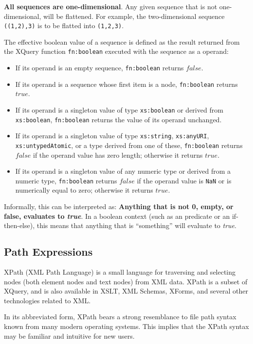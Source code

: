 \textbf{All sequences are one-dimensional}. Any given sequence that is not
one-dimensional, will be flattened. For example, the two-dimensional sequence
\verb!((1,2),3)! is to be flatted into \verb!(1,2,3)!.

The effective boolean value of a sequence is defined as the result returned from the XQuery function
\texttt{fn:boolean} executed with the sequence as a operand:
\begin{itemize}
  \item If its operand is an empty sequence, \texttt{fn:boolean} returns $false$.
  \item If its operand is a sequence whose first item is a node, \texttt{fn:boolean} returns $true$.
  \item If its operand is a singleton value of type \texttt{xs:boolean} or derived from \texttt{xs:boolean},
  \texttt{fn:boolean} returns the value of its operand unchanged.
  \item If its operand is a singleton value of type \texttt{xs:string}, \texttt{xs:anyURI},
  \texttt{xs:untypedAtomic}, or a type derived from one of these, \texttt{fn:boolean} returns $false$ if the
  operand value has zero length; otherwise it returns $true$.
  \item If its operand is a singleton value of any numeric type or derived from a numeric type,
  \texttt{fn:boolean} returns $false$ if the operand value is \texttt{NaN} or is numerically equal to zero;
  otherwise it returns $true$.
\end{itemize}
Informally, this can be interpreted as: \textbf{Anything that is not 0, empty, or false, evaluates to
\textit{true}}. In a boolean context (such as an predicate or an if-then-else), this means that
anything that is ``something'' will evaluate to \textit{true}.


\subsection{Path Expressions}
\label{sect:theory:xquery:PathExpressions}
XPath (XML Path Language) is a small language for traversing and selecting
nodes (both element nodes and text nodes) from XML data. XPath is a subset of
XQuery, and is also available in XSLT, XML Schemas, XForms, and several other
technologies related to XML. 

In its abbreviated form, XPath bears a strong resemblance to file path syntax
known from many modern operating systems. This implies that the XPath syntax
may be familiar and intuitive for new users.

